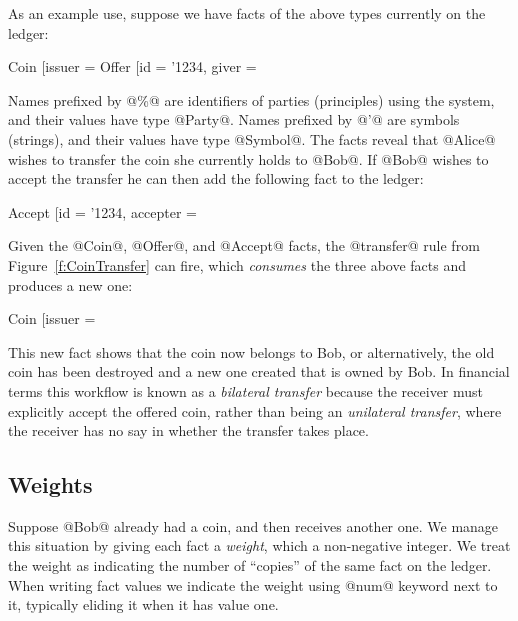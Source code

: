 As an example use, suppose we have facts of the above types currently on the ledger:
\begin{small}
\begin{code}
 Coin   [issuer = %
 Offer  [id = '1234, giver = %
\end{code}
\end{small}

Names prefixed by @\%@ are identifiers of parties (principles) using the system, and their values have type @Party@. Names prefixed by @'@ are symbols (strings), and their values have type @Symbol@. The facts reveal that @Alice@ wishes to transfer the coin she currently holds to @Bob@. If @Bob@ wishes to accept the transfer he can then add the following fact to the ledger:
\begin{small}
\begin{code}
 Accept [id = '1234, accepter = %
\end{code}
\end{small}

Given the @Coin@, @Offer@, and @Accept@ facts, the @transfer@ rule from Figure~\ref{f:CoinTransfer} can fire, which \emph{consumes} the three above facts and produces a new one:
\begin{small}
\begin{code}
 Coin [issuer = %
\end{code}
\end{small}

This new fact shows that the coin now belongs to Bob, or alternatively, the old coin has been destroyed and a new one created that is owned by Bob. In financial terms this workflow is known as a \emph{bilateral transfer} because the receiver must explicitly accept the offered coin, rather than being an \emph{unilateral transfer}, where the receiver has no say in whether the transfer takes place.


\subsection{Weights}
\label{s:Weights}
Suppose @Bob@ already had a coin, and then receives another one. We manage this situation by giving each fact a \emph{weight}, which a non-negative integer. We treat the weight as indicating the number of ``copies'' of the same fact on the ledger. When writing fact values we indicate the weight using @num@ keyword next to it, typically eliding it when it has value one.


